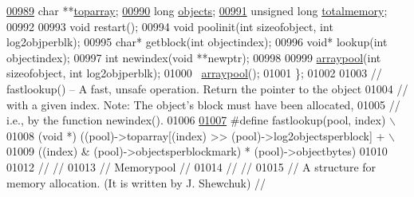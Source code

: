 \begin{DoxyCode}
\hypertarget{tetgen_8h_source.tex_l00989}{}\hyperlink{classtetgenmesh_1_1arraypool_a3a4e28a88226f1dd777773fe45094650}{00989}     \textcolor{keywordtype}{char} **\hyperlink{classtetgenmesh_1_1arraypool_a3a4e28a88226f1dd777773fe45094650}{toparray};
\hypertarget{tetgen_8h_source.tex_l00990}{}\hyperlink{classtetgenmesh_1_1arraypool_a23345232309fd68d2e3afa6d017299b0}{00990}     \textcolor{keywordtype}{long} \hyperlink{classtetgenmesh_1_1arraypool_a23345232309fd68d2e3afa6d017299b0}{objects};
\hypertarget{tetgen_8h_source.tex_l00991}{}\hyperlink{classtetgenmesh_1_1arraypool_af264f265d5752e75f50adea472ecd59f}{00991}     \textcolor{keywordtype}{unsigned} \textcolor{keywordtype}{long} \hyperlink{classtetgenmesh_1_1arraypool_af264f265d5752e75f50adea472ecd59f}{totalmemory};
00992 
00993     \textcolor{keywordtype}{void} restart();
00994     \textcolor{keywordtype}{void} poolinit(\textcolor{keywordtype}{int} sizeofobject, \textcolor{keywordtype}{int} log2objperblk);
00995     \textcolor{keywordtype}{char}* getblock(\textcolor{keywordtype}{int} objectindex);
00996     \textcolor{keywordtype}{void}* lookup(\textcolor{keywordtype}{int} objectindex);
00997     \textcolor{keywordtype}{int} newindex(\textcolor{keywordtype}{void} **newptr);
00998 
00999     \hyperlink{classtetgenmesh_1_1arraypool}{arraypool}(\textcolor{keywordtype}{int} sizeofobject, \textcolor{keywordtype}{int} log2objperblk);
01000     ~\hyperlink{classtetgenmesh_1_1arraypool}{arraypool}();
01001   \};
01002 
01003 \textcolor{comment}{// fastlookup() -- A fast, unsafe operation. Return the pointer to the object}
01004 \textcolor{comment}{//   with a given index.  Note: The object's block must have been allocated,}
01005 \textcolor{comment}{//   i.e., by the function newindex().}
01006 
\hypertarget{tetgen_8h_source.tex_l01007}{}\hyperlink{tetgen_8h_a0ab265eb249e3d750e491647d17a0f4c}{01007} \textcolor{preprocessor}{#define fastlookup(pool, index) \(\backslash\)}
01008 \textcolor{preprocessor}{  (void *) ((pool)->toparray[(index) >> (pool)->log2objectsperblock] + \(\backslash\)}
01009 \textcolor{preprocessor}{            ((index) & (pool)->objectsperblockmark) * (pool)->objectbytes)}
01010 
01012 \textcolor{comment}{//                                                                           //}
01013 \textcolor{comment}{// Memorypool                                                                //}
01014 \textcolor{comment}{//                                                                           //}
01015 \textcolor{comment}{// A structure for memory allocation. (It is written by J. Shewchuk)         //}

\end{DoxyCode}
